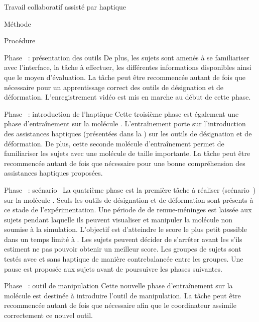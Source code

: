 \documentclass[myfrancais]{mythesis}
\begin{document}
\begin{mychapter}{Travail collaboratif assisté par haptique}
\begin{mysection}{Méthode}
\begin{mysubsection}{Procédure}
\begin{myparagraph}{Phase~ : présentation des outils}
					De plus, les sujets sont amenés à se familiariser avec l'interface, la tâche à effectuer, les différentes informations disponibles ainsi que le moyen d'évaluation.
					La tâche peut être recommencée autant de fois que nécessaire pour un apprentissage correct des outils de désignation et de déformation.
					L'enregistrement vidéo est mis en marche au début de cette phase.
				\end{myparagraph}
				\begin{myparagraph}{Phase~ : introduction de l'haptique}
					Cette troisième phase est également une phase d'entraînement sur la molécule \myPrion.
					L'entraînement porte sur l'introduction des assistances haptiques (présentées dans la ) sur les outils de désignation et de déformation.
					De plus, cette seconde molécule d'entraînement permet de familiariser les sujets avec une molécule de taille importante.
					La tâche peut être recommencée autant de fois que nécessaire pour une bonne compréhension des assistances haptiques proposées.
				\end{myparagraph}
				\begin{myparagraph}{Phase~ : scénario~}
					La quatrième phase est la première tâche à réaliser (scénario~) sur la molécule \myUbiquitin.
					Seuls les outils de désignation et de déformation sont présents à ce stade de l'expérimentation.
					Une période de  de remue-méninges est laissée aux sujets pendant laquelle ils peuvent visualiser et manipuler la molécule non soumise à la simulation.
					L'objectif est d'atteindre le score  le plus petit possible dans un temps limité à .
					Les sujets peuvent décider de s'arrêter avant les  s'ils estiment ne pas pouvoir obtenir un meilleur score.
					Les groupes de sujets sont testés avec et sans haptique de manière contrebalancée entre les groupes.
					Une pause est proposée aux sujets avant de poursuivre les phases suivantes.
				\end{myparagraph}
				\begin{myparagraph}{Phase~ : outil de manipulation}
					Cette nouvelle phase d'entraînement sur la molécule \myTRPZIPPER est destinée à introduire l'outil de manipulation.
					La tâche peut être recommencée autant de fois que nécessaire afin que le coordinateur assimile correctement ce nouvel outil.
				\end{myparagraph}

\end{mysubsection}
\end{mysection}
\end{mychapter}
\end{document}
